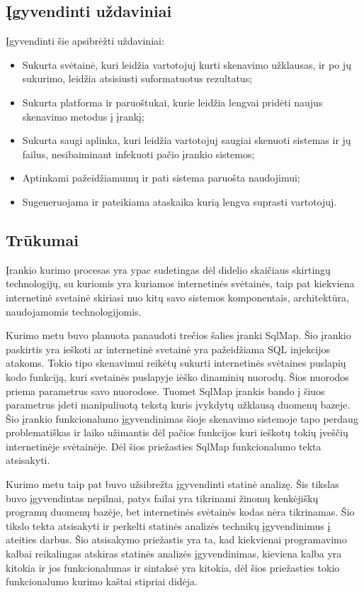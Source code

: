\documentclass[a4paper,12pt,fleqn]{article}
\begin{document}
\subsection{Įgyvendinti uždaviniai}
\label{sec:example}
Įgyvendinti šie apsibrėžti uždaviniai: 
\begin{itemize}
	\item Sukurta svėtainė, kuri leidžia vartotojuj kurti skenavimo užklausas, ir po jų sukurimo, leidžia atsisiusti suformatuotus rezultatus;
	\item Sukurta platforma ir paruoštukai, kurie leidžia lengvai pridėti naujus skenavimo metodus į įrankį;
	\item Sukurta saugi aplinka, kuri leidžia vartotojuj saugiai skenuoti sistemas ir jų failus, nesibaiminant infekuoti pačio įrankio sistemos;
	\item Aptinkami pažeidžiamumų ir pati sistema paruošta naudojimui;
	\item Sugeneruojama ir pateikiama ataskaika kurią lengva suprasti vartotojuj.
\end{itemize}


\subsection{Trūkumai}
\label{sec:example}

Įrankio kurimo procesas yra ypac sudetingas dėl didelio skaičiaus skirtingų technologijų, su kuriomis yra kuriamos internetinės svėtainės, taip pat kiekviena internetinė svetainė skiriasi nuo kitų savo sistemos komponentais, architektūra, naudojamomis technologijomis.

Kurimo metu buvo planuota panaudoti trečios šalies įranki SqlMap. Šio įrankio paskirtis yra ieškoti ar internetinė svetainė yra pažeidžiama SQL injekcijos atakoms. Tokio tipo skenavimui reikėtų sukurti internetinės svėtaines puslapių kodo funkciją, kuri svetainės puslapyje iėško dinaminių nuorodų. Šios nuorodos priema parametrus savo nuorodose. Tuomet SqlMap įrankis bando į šiuos parametrus įdeti manipuliuotą tekstą kuris įvykdytų užklausą duomenų bazeje. Šio įrankio funkcionalumo įgyvendinimas šioje skenavimo sistemoje tapo perdaug problematiškas ir laiko užimantis dėl pačios funkcijos kuri ieškotų tokių įveščių internetinėje svėtainėje. Dėl šios priežasties SqlMap funkcionalumo tekta atsisakyti.

Kurimo metu taip pat buvo užsibrežta įgyvendinti statinė analizę. Šis tikslas buvo įgyvendintas nepilnai, patys failai yra tikrinami žinomų kenkėjiškų programų duomenų bazėje, bet internetinės svėtainės kodas nėra tikrinamas. Šio tikslo tekta atsisakyti ir perkelti statinės analizės technikų įgyvendinimus į ateities darbus. Šio atsisakymo priežastis yra ta, kad kiekvienai programavimo kalbai reikalingas atskiras statinės analizės įgyvendinimas, kieviena kalba yra kitokia ir jos funkcionalumas ir sintaksė yra kitokia, dėl šios priežasties tokio funkcionalumo kurimo kaštai stipriai didėja.
\end{document}
